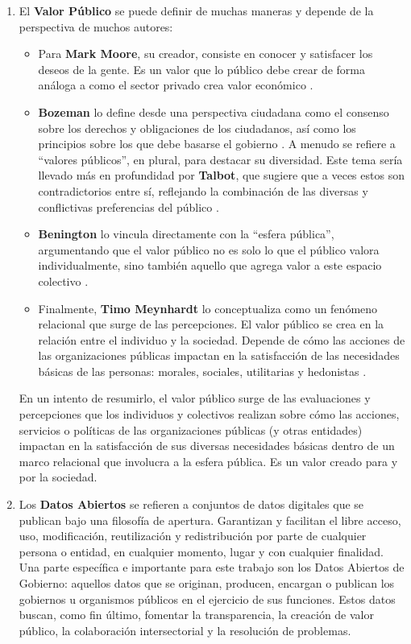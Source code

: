\begin{enumerate}
	\item El \textbf{Valor Público} se puede definir de muchas maneras y depende de la perspectiva de muchos autores:
	\label{def3}
	\begin{itemize}
		\item[\textbullet] Para \textbf{Mark Moore}, su creador, consiste en conocer y satisfacer los deseos de la gente. Es un valor que lo público debe crear de forma análoga a como el sector privado crea valor económico \citep{moore1995creating}.
		\item[\textbullet] \textbf{Bozeman} lo define desde una perspectiva ciudadana como el consenso sobre los derechos y obligaciones de los ciudadanos, así como los principios sobre los que debe basarse el gobierno \citep{bozeman2007public}. A menudo se refiere a ``valores públicos'', en plural, para destacar su diversidad. Este tema sería llevado más en profundidad por \textbf{Talbot}, que sugiere que a veces estos son contradictorios entre sí, reflejando la combinación de las diversas y conflictivas preferencias del público \citep{Talbot01012011}.
		\item[\textbullet] \textbf{Benington} lo vincula directamente con la ``esfera pública'', argumentando que el valor público no es solo lo que el público valora individualmente, sino también aquello que agrega valor a este espacio colectivo \citep{Benington19032009}.
		\item[\textbullet] Finalmente, \textbf{Timo Meynhardt} lo conceptualiza como un fenómeno relacional que surge de las percepciones. El valor público se crea en la relación entre el individuo y la sociedad. Depende de cómo las acciones de las organizaciones públicas impactan en la satisfacción de las necesidades básicas de las personas: morales, sociales, utilitarias y hedonistas \citep{Meynhardt19032009}.
	\end{itemize}

	En un intento de resumirlo, el valor público surge de las evaluaciones y percepciones que los individuos y colectivos realizan sobre cómo las acciones, servicios o políticas de las organizaciones públicas (y otras entidades) impactan en la satisfacción de sus diversas necesidades básicas dentro de un marco relacional que involucra a la esfera pública. Es un valor creado para y por la sociedad. \\

	\item Los \textbf{Datos Abiertos} \label{def4} se refieren a conjuntos de datos digitales que se publican bajo una filosofía de apertura. Garantizan y facilitan el libre acceso, uso, modificación, reutilización y redistribución por parte de cualquier persona o entidad, en cualquier momento, lugar y con cualquier finalidad. Una parte específica e importante para este trabajo son los Datos Abiertos de Gobierno: aquellos datos que se originan, producen, encargan o publican los gobiernos u organismos públicos en el ejercicio de sus funciones. Estos datos buscan, como fin último, fomentar la transparencia, la creación de valor público, la colaboración intersectorial y la resolución de problemas.


\end{enumerate}
